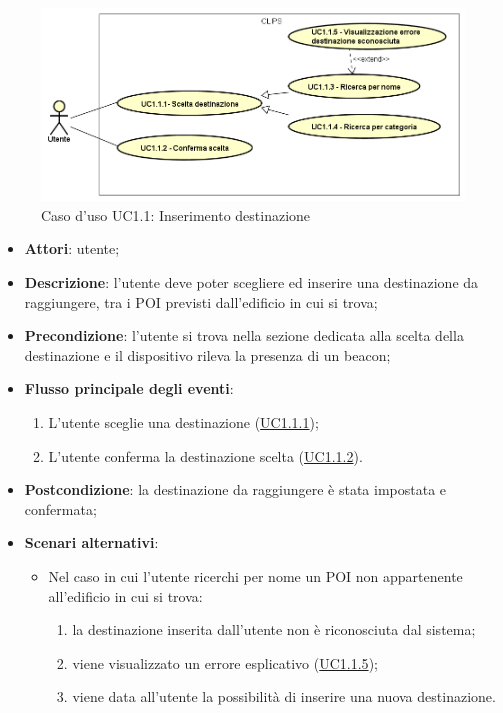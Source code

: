 \documentclass[../AnalisiDeiRequisiti.tex]{subfiles}
\begin{document}
\begin{figure}[H]
	\centering
	\includegraphics[scale=0.95, width=\textwidth]{img/UC1-1.png}
	\caption{Caso d'uso UC1.1: Inserimento destinazione}\label{fig:UC1.1} 
\end{figure}
\begin{itemize}
	\item \textbf{Attori}: utente;
	\item \textbf{Descrizione}: l'utente deve poter scegliere ed inserire una destinazione da raggiungere, tra i POI previsti dall'edificio in cui si trova; 
	\item \textbf{Precondizione}: l'utente si trova nella sezione dedicata alla scelta della destinazione e il dispositivo rileva la presenza di un beacon;
	
	\item \textbf{Flusso principale degli eventi}:
	\begin{enumerate}
		\item L'utente sceglie una destinazione  (\hyperlink{UC1.1.1}{UC1.1.1});
		\item L'utente conferma la destinazione scelta  (\hyperlink{UC1.1.2}{UC1.1.2}).
		
	\end{enumerate}
	\item \textbf{Postcondizione}: la destinazione da raggiungere è stata impostata e confermata;
	\item \textbf{Scenari alternativi}: 
	\begin{itemize}
		\item Nel caso in cui l'utente ricerchi per nome un POI non appartenente all'edificio in cui si trova: 
		\begin{enumerate}
			\item la destinazione inserita dall'utente non è riconosciuta dal sistema;
			\item viene visualizzato un errore esplicativo (\hyperlink{UC1.1.5}{UC1.1.5});
			\item viene data all’utente la possibilità di inserire una nuova destinazione.
		\end{enumerate}
	\end{itemize}
\end{itemize}
\hypertarget{UC1.1.1}{}
\end{document}
